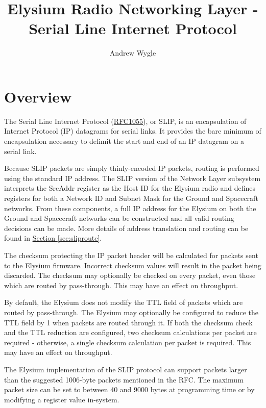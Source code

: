 \documentclass{hitec}
\author{Andrew Wygle}
\title{Elysium Radio Networking Layer - Serial Line Internet Protocol}
\begin{document}

\maketitle

\tableofcontents
\listoffigures
\listoftables

\section{Overview}
\label{ch:overview}

The Serial Line Internet Protocol
(\href{https://tools.ietf.org/html/rfc1055}{RFC1055}), or SLIP,  is an
encapsulation of Internet Protocol (IP) datagrams for serial links. It provides
the bare minimum of encapsulation necessary to delimit the start and end of an
IP datagram on a serial link.

Because SLIP packets are simply thinly-encoded IP packets, routing is performed
using the standard IP address. The SLIP version of the Network Layer subsystem
interprets the SrcAddr register as the Host ID for the Elysium radio and
defines registers for both a Network ID and Subnet Mask for the Ground and
Spacecraft networks. From these components, a full IP address for the Elysium
on both the Ground and Spacecraft networks can be constructed and all valid
routing decisions can be made. More details of address translation and routing
can be found in \hyperref[sec:sliproute]{Section \ref{sec:sliproute}}.

The checksum protecting the IP packet header will be calculated for packets
sent to the Elysium firmware. Incorrect checksum values will result in the
packet being discarded. The checksum may optionally be checked on every packet,
even those which are routed by pass-through. This may have an effect on
throughput.

By default, the Elysium does not modify the TTL field of packets which are
routed by pass-through. The Elysium may optionally be configured to reduce the
TTL field by 1 when packets are routed through it. If both the checksum check
and the TTL reduction are configured, two checksum calculations per packet are
required - otherwise, a single checksum calculation per packet is required.
This may have an effect on throughput.

The Elysium implementation of the SLIP protocol can support packets larger than
the suggested 1006-byte packets mentioned in the RFC. The maximum packet size
can be set to between 40 and 9000 bytes at programming time or by modifying a
register value in-system.
\end{document}
